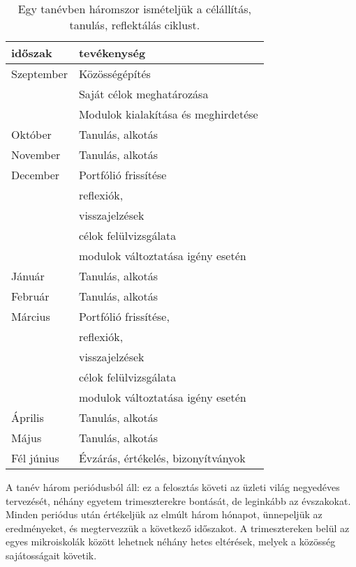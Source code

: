 			\begin{table}
\centering
				\begin{tabular}{ l|l }
    \textbf{időszak} & \textbf{tevékenység}\\
    \hline
    Szeptember&
    Közösségépítés \\
  & Saját célok meghatározása \\
  & Modulok kialakítása és meghirdetése
  \\ \hline

    Október&
    Tanulás, alkotás
  \\ \hline

    November&
    Tanulás, alkotás
  \\ \hline

    December&
    Portfólió frissítése\\
    & reflexiók, \\
    & visszajelzések \\
    & célok felülvizsgálata \\
    & modulok változtatása igény esetén
  \\ \hline

    Jánuár&
    Tanulás, alkotás
  \\ \hline

    Február&
    Tanulás, alkotás
  \\ \hline

    Március&
    Portfólió frissítése, \\
    & reflexiók,\\
    & visszajelzések \\
    & célok felülvizsgálata \\
    & modulok változtatása igény esetén
  \\ \hline

    Április&
    Tanulás, alkotás
  \\ \hline

    Május&
    Tanulás, alkotás
  \\ \hline

    Fél június&
    Évzárás, értékelés, bizonyítványok
    \end{tabular}
    \caption{Egy tanévben háromszor ismételjük a célállítás, tanulás, reflektálás ciklust.}
    \label{tbl:tanevritmus}
  \end{table}


A tanév három periódusból áll: ez a felosztás követi az üzleti világ negyedéves tervezését, néhány egyetem trimeszterekre bontását, de leginkább az évszakokat. Minden periódus után értékeljük az elmúlt három hónapot, ünnepeljük az eredményeket, és megtervezzük a következő időszakot.  A trimesztereken belül az egyes mikroiskolák között lehetnek néhány hetes eltérések, melyek a közösség sajátosságait követik.

